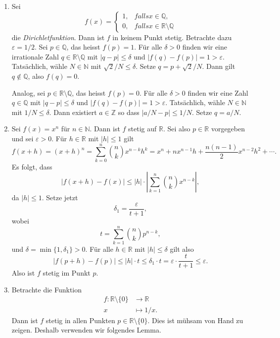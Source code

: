 \documentclass[../main.tex]{subfiles}
\begin{document}
\begin{examples}
\begin{enumerate}[(1)]
    \item Sei
      \[
        f(x) = 
        \begin{cases}
          1, & falls x \in \mathbb{Q}, \\
          0,& falls x \in \mathbb{R} \setminus \mathbb{Q}
        \end{cases}
      \]
      die \emph{Dirichletfunktion}.
      Dann ist $f$ in keinem Punkt stetig.
      Betrachte dazu $\varepsilon = 1/2$.
      Sei $p \in \mathbb{Q}$, das heisst $f(p) = 1$.
      Für alle $\delta > 0$ finden wir eine
      irrationale Zahl
      $q \in \mathbb{R} \setminus \mathbb{Q}$ mit
      $|q - p| \leq \delta$ 
      und
      $|f(q) - f(p)| = 1 > \varepsilon$.
      Tatsächlich, wähle $N \in \mathbb{N}$ 
      mit $\sqrt 2 / N \leq \delta$.
      Setze
      $q = p +\sqrt 2/N$. Dann gilt  $q \notin \mathbb{Q}$,
      also $f(q) = 0$.

      Analog, sei $p \in \mathbb{R} \setminus \mathbb{Q}$,
      das heisst $f(p) = 0$.
      Für alle $\delta > 0$ finden wir
      eine Zahl $q \in \mathbb{Q}$ mit $|q - p| \leq \delta$ 
      und
      $|f(q) - f(p)| = 1 > \varepsilon$.
      Tatsächlich,
      wähle $N \in \mathbb{N}$ mit $1/N \leq \delta$.
      Dann existiert $a \in \mathbb{Z}$
      so dass
      $|a/N - p| \leq 1/N$.
      Setze $q = a/N$.
    \item Sei $f(x) = x^n$ für $n \in \mathbb{N}$.
      Dann ist $f$ stetig auf $\mathbb{R}$.
      Sei also $p \in \mathbb{R}$ vorgegeben und
      sei $\varepsilon > 0$.
      Für
      $h \in \mathbb{R}$ mit $|h| \leq 1$ gilt
      \[
        f(x + h) = (x + h)^n = \sum_{k=0}^{n} \binom{n}{k}
        x^{n-k}h^k
        = x^n + nx^{n-1}h + \frac{n(n-1)}{2}x^{n-2}h^2 + \cdots.
      \]
      Es folgt, dass
      \[
        |f(x + h) - f(x)| \leq |h| \cdot
        \left| \sum_{k=1}^{n} \binom{n}{k} x^{n-k} \right|,
      \]
      da $|h| \leq 1$.
      Setze jetzt
      \[
        \delta_1 = \frac{\varepsilon}{t+1},
      \]
      wobei
      \[
        t = \sum_{k=1}^{n} \binom{n}{k} p^{n-k},
      \]
      und $\delta = \min \{1, \delta_1\} > 0$.
      Für alle  $h \in \mathbb{R}$
      mit $|h| \leq \delta$ gilt also
      \[
        |f(p+h) - f(p)| \leq |h| \cdot t \leq
        \delta_1 \cdot t = \varepsilon \cdot \frac{t}{t+1}
        \leq \varepsilon.
      \]
      Also ist $f$ stetig im Punkt $p$.
    \item Betrachte die Funktion
      \begin{align*}
        f \colon \mathbb{R} \setminus \{0\} & \to \mathbb{R} \\
        x & \mapsto 1/x.
      \end{align*}
      Dann ist $f$ stetig in allen Punkten
      $p \in \mathbb{R} \setminus \{0\}$. Dies ist
      mühsam von Hand zu zeigen. Deshalb
      verwenden wir folgendes Lemma.
  \end{enumerate}
\end{examples}
\end{document}
